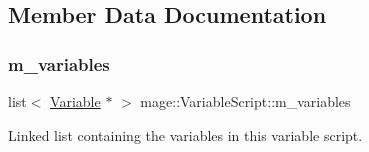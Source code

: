 \subsection{Member Data Documentation}
\hypertarget{classmage_1_1_variable_script_a14dfd0518fe06cbfaf409fd5223f63e5}{}\label{classmage_1_1_variable_script_a14dfd0518fe06cbfaf409fd5223f63e5} 
\subsubsection{\texorpdfstring{m\+\_\+variables}{m\_variables}}
{\footnotesize\ttfamily list$<$ \hyperlink{structmage_1_1_variable}{Variable} $\ast$ $>$ mage\+::\+Variable\+Script\+::m\+\_\+variables\hspace{0.3cm}{\ttfamily [private]}}

Linked list containing the variables in this variable script. 